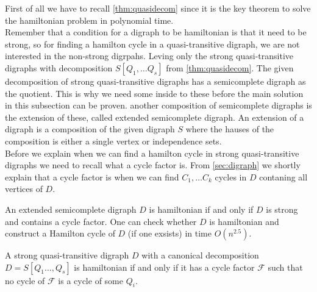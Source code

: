 First of all we have to recall \autoref{thm:quasidecom} since it is the key theorem to solve the hamiltonian problem in polynomial time. \\
Remember that a condition for a digraph to be hamiltonian is that it need to be strong, so for finding a hamilton cycle in a quasi-transitive digraph, we are not interested in the non-strong digrpahs. 
Leving only the strong quasi-transitive digraphs with decomposition $S[Q_1,\dots Q_s]$ from \autoref{thm:quasidecom}. 
The given decomposition of strong quasi-transitive digraphs has a semicomplete digraph as the quotient. This is why we need some inside to these before the main solution in this subsection can be proven. another composition of semicomplete digraphs is the extension of these, called extended semicomplete digraph. An extension of a digraph is a composition of the given digraph $S$ where the hauses of the composition is either a single vertex or independence sets. \\
Before we explain when we can find a hamilton cycle in strong quasi-transitive digraphs we need to recall what a cycle factor is. 
From \autoref{sec:digraph} we shortly explain that a cycle factor is when we can find $C_1,\dots C_k$ cycles in $D$ contaning all vertices of $D$. 
\begin{thm}
    An extended semicomplete digraph $D$ is hamiltonian if and only if $D$ is strong and contains a cycle factor. One can check whether $D$ is hamiltonian and construct a Hamilton cycle of $D$ (if one exsists) in time $O(n^{2.5})$.
    \label{thm:extended}
\end{thm}
\begin{thm}
    A strong quasi-transitive digraph $D$ with a canonical decomposition \\$D=S[Q_1\dots, Q_s]$ is hamiltonian if and only if it has a cycle factor $\mathcal{F}$ such that no cycle of $\mathcal{F}$ is a cycle of some $Q_i$.
    \label{thm:qhcycle}
\end{thm}
